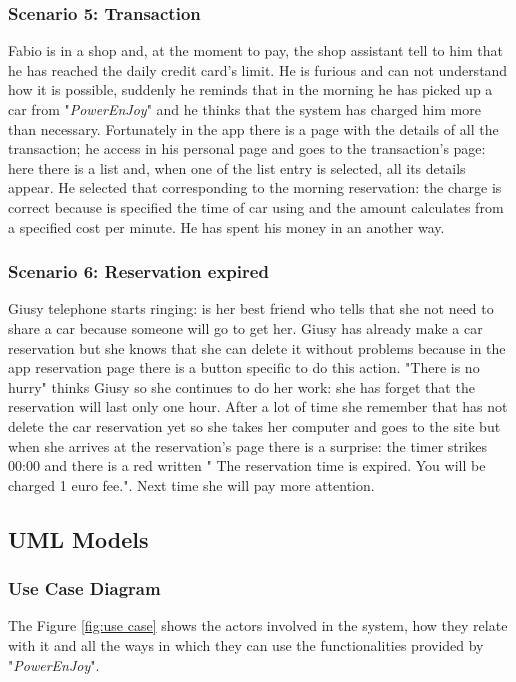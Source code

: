 \subsubsection{Scenario 5: Transaction} \label{sce5}
Fabio is in a shop and, at the moment to pay, the shop assistant tell to him that he has reached the daily credit card's limit. He is furious and can not understand how it is possible, suddenly he reminds that in the morning he has picked up a car from "\textit{PowerEnJoy}" and he thinks that the system has charged him more than necessary. Fortunately in the app there is a page with the details of all the transaction; he access in his personal page and goes to the transaction's page: here there is a list and, when one of the list entry is selected, all its details appear. He selected that corresponding to the morning reservation: the charge is correct because is specified the time of car using and the amount calculates from a specified cost per minute. He has spent his money in an another way.
\subsubsection{Scenario 6: Reservation expired} \label{sce6}
Giusy telephone starts ringing: is her best friend who tells that she not need to share a car because someone will go to get her. Giusy has already make a car reservation but she knows that she can delete it without problems because in the app reservation page there is a button specific to do this action. "There is no hurry" thinks Giusy so she continues to do her work: she has forget that the reservation will last only one hour. After a lot of time she remember that has not delete the car reservation yet so she takes her computer and goes to the site but when she arrives at the reservation's page there is a surprise: the timer strikes 00:00 and there is a red written " The reservation time is expired. You will be charged 1 euro fee.". Next time she will pay more attention. 
\clearpage  

\subsection{UML Models}
\subsubsection{Use Case Diagram}

The Figure \ref{fig:use case} shows the actors involved in the system, how they relate with it and all the ways in which they can use the functionalities provided by "\textit{PowerEnJoy}".  


